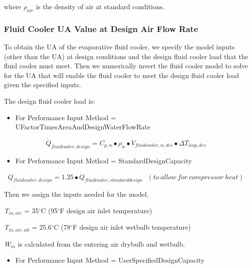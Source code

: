 where \(\rho_{air}\) is the density of air at standard conditions.

\subsubsection{Fluid Cooler UA Value at Design Air Flow Rate}\label{fluid-cooler-ua-value-at-design-air-flow-rate-1}

To obtain the UA of the evaporative fluid cooler, we specify the model inputs (other than the UA) at design conditions and the design fluid cooler load that the fluid cooler must meet. Then we numerically invert the fluid cooler model to solve for the UA that will enable the fluid cooler to meet the design fluid cooler load given the specified inputs.

The design fluid cooler load is:

\begin{itemize}
\tightlist
\item
  For Performance Input Method = UFactorTimesAreaAndDesignWaterFlowRate
\end{itemize}

\begin{equation}
{\dot Q_{fluidcooler,design}} = {C_{p,w}} \bullet {\rho_w} \bullet {\dot V_{fluidcooler,w,des}} \bullet \Delta {T_{loop,des}}
\end{equation}

\begin{itemize}
\tightlist
\item
  For Performance Input Method = StandardDesignCapacity
\end{itemize}

\begin{equation}
{\dot Q_{fluidcooler,design}} = 1.25 \bullet {\dot Q_{fluidcooler,standarddesign}}~~~(to~allow~for~compressor~heat)
\end{equation}

Then we assign the inputs needed for the model.

\emph{T\(_{in,air}\)} = 35\(^{\circ}\)C (95\(^{\circ}\)F design air inlet temperature)

\emph{T\(_{in,air,wb}\)} = 25.6\(^{\circ}\)C (78\(^{\circ}\)F design air inlet wetbulb temperature)

\emph{W\(_{in}\)} is calculated from the entering air drybulb and wetbulb.

\begin{itemize}
\tightlist
\item
  For Performance Input Method = UserSpecifiedDesignCapacity
\end{itemize}

